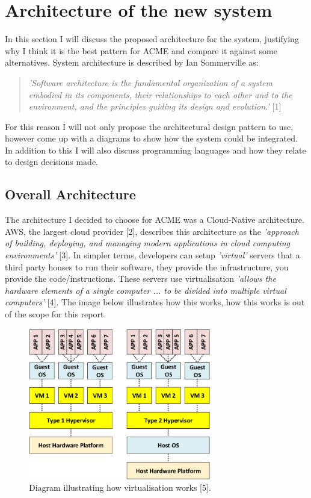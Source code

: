 \section{Architecture of the new system}
  In this section I will discuss the proposed architecture for the system, justifying why I think it is the best pattern for ACME and compare it against 
  some alternatives. System architecture is described by Ian Sommerville as:
  \begin{quote}
    \textit{'Software architecture is the fundamental organization of a system embodied in its
    components, their relationships to each other and to the environment, and the principles
    guiding its design and evolution.'} [1]
  \end{quote}

  For this reason I will not only propose the architectural design pattern to use, however come up with a diagrams to show how the system could be integrated.
  In addition to this I will also discuss programming languages and how they relate to design decisions made.

  \subsection{Overall Architecture}
  The architecture I decided to choose for ACME was a Cloud-Native architecture. AWS, the largest cloud provider [2], describes this architecture as the 
  \textit{'approach of building, deploying, and managing modern applications in cloud computing environments'} [3]. In simpler terms, developers can setup
  \textit{'virtual'} servers that a third party houses to run their software, they provide the infrastructure, you provide the code/instructions. These servers
  use virtualisation \textit{'allows the hardware elements of a single computer ... to be divided into multiple virtual computers'} [4]. The image below 
  illustrates how this works, how this works is out of the scope for this report.

  \begin{figure}[H]
    \centering
    \includegraphics[width=8cm]{assets/virtualisation.png}
    \caption{Diagram illustrating how virtualisation works [5].}
    \label{fig:virtualisation}
  \end{figure}

